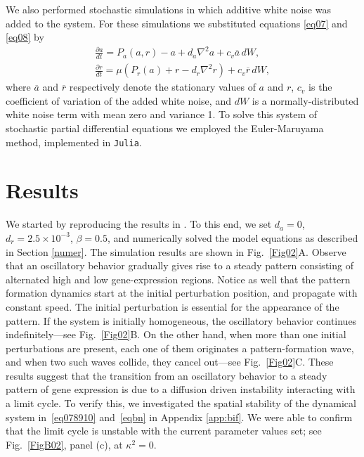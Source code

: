 \documentclass[11pt]{article}
\begin{document}
	We also performed stochastic simulations in which additive white noise was added
	to the system. For these simulations we substituted equations \eqref{eq07} and
	\eqref{eq08} by
	\begin{subequations}\label{eq1112}
		\begin{gather}
		\frac{\partial a}{dt} = P_a(a, r) - a + d_a \nabla^2 a + c_v \overline{a} \,
		dW, \label{eq11} \\
		\frac{\partial r}{dt}= \mu (P_r(a) + r - d_r \nabla^2 r) + c_v \overline{r} \,
		dW, \label{eq12}
		\end{gather}
	\end{subequations}
	where $\overline{a}$ and $\overline{r}$ respectively denote the stationary
	values of  $a$ and $r$, $c_v$ is the coefficient of variation of the added white
	noise, and $dW$ is a normally-distributed white noise term with mean zero and
	variance 1. To solve this system of stochastic partial differential equations we
	employed the Euler-Maruyama method, implemented in \texttt{Julia}.
	
	\section{Results}
	\label{res}
	
	We started by reproducing the results in \citep{Cotterell2015}. To this end, we
	set $d_a=0$, $d_r = 2.5\times10^{-3}$, $\beta = 0.5$, and numerically solved the
	model equations as described in Section \ref{numer}. The simulation results are
	shown in Fig.~\ref{Fig02}A. Observe that an oscillatory behavior
	gradually gives rise to a steady pattern consisting of alternated high and low
	gene-expression regions. Notice as well that the pattern formation dynamics start at
	the initial perturbation position, and propagate with constant speed. The
	initial perturbation is essential for the appearance of the pattern. If the
	system is initially homogeneous, the oscillatory behavior continues
	indefinitely---see Fig.~\ref{Fig02}B. On the other hand, when more than one
	initial perturbations are present, each one of them originates a
	pattern-formation wave, and when two such waves collide, they cancel out---see 
	Fig.~\ref{Fig02}C. These results suggest that the transition from an
	oscillatory behavior to a steady pattern of gene expression is due to a
	diffusion driven instability interacting with a limit cycle. To verify this,
	we investigated the spatial stability of the dynamical system
	in~\eqref{eq078910} and~\eqref{eqbn} in
	Appendix \ref{app:bif}. We were able to confirm
	that the limit cycle is unstable with the current parameter values set; see
	Fig.~\ref{FigB02}, panel (c), at $\kappa^2=0$.
	
\end{document}
